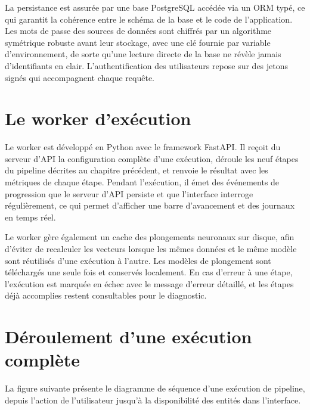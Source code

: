 \noindent La persistance est assurée par une base PostgreSQL accédée via un ORM typé, ce qui garantit la cohérence entre le schéma de la base et le code de l'application. Les mots de passe des sources de données sont chiffrés par un algorithme symétrique robuste avant leur stockage, avec une clé fournie par variable d'environnement, de sorte qu'une lecture directe de la base ne révèle jamais d'identifiants en clair. L'authentification des utilisateurs repose sur des jetons signés qui accompagnent chaque requête.

\section{Le worker d'exécution}

Le worker est développé en Python avec le framework FastAPI. Il reçoit du serveur d'API la configuration complète d'une exécution, déroule les neuf étapes du pipeline décrites au chapitre précédent, et renvoie le résultat avec les métriques de chaque étape. Pendant l'exécution, il émet des événements de progression que le serveur d'API persiste et que l'interface interroge régulièrement, ce qui permet d'afficher une barre d'avancement et des journaux en temps réel.

Le worker gère également un cache des plongements neuronaux sur disque, afin d'éviter de recalculer les vecteurs lorsque les mêmes données et le même modèle sont réutilisés d'une exécution à l'autre. Les modèles de plongement sont téléchargés une seule fois et conservés localement. En cas d'erreur à une étape, l'exécution est marquée en échec avec le message d'erreur détaillé, et les étapes déjà accomplies restent consultables pour le diagnostic.

\section{Déroulement d'une exécution complète}

La figure suivante présente le diagramme de séquence d'une exécution de pipeline, depuis l'action de l'utilisateur jusqu'à la disponibilité des entités dans l'interface.

